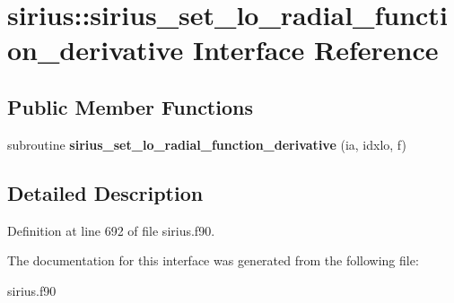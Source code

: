 \hypertarget{interfacesirius_1_1sirius__set__lo__radial__function__derivative}{}\section{sirius\+:\+:sirius\+\_\+set\+\_\+lo\+\_\+radial\+\_\+function\+\_\+derivative Interface Reference}
\label{interfacesirius_1_1sirius__set__lo__radial__function__derivative}
\subsection*{Public Member Functions}
\begin{DoxyCompactItemize}
\item 
\hypertarget{interfacesirius_1_1sirius__set__lo__radial__function__derivative_a816bb58b85b74bdf9131abf834fe4ecb}{}subroutine {\bfseries sirius\+\_\+set\+\_\+lo\+\_\+radial\+\_\+function\+\_\+derivative} (ia, idxlo, f)\label{interfacesirius_1_1sirius__set__lo__radial__function__derivative_a816bb58b85b74bdf9131abf834fe4ecb}

\end{DoxyCompactItemize}


\subsection{Detailed Description}


Definition at line 692 of file sirius.\+f90.



The documentation for this interface was generated from the following file\+:\begin{DoxyCompactItemize}
\item 
sirius.\+f90\end{DoxyCompactItemize}
